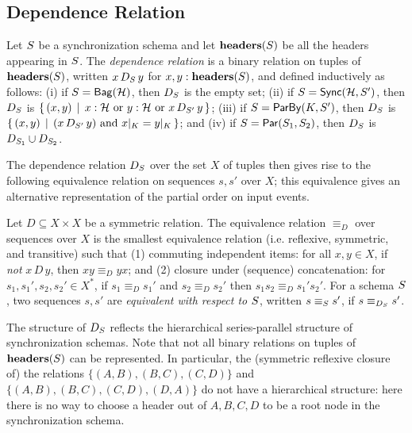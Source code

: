 \subsection{Dependence Relation}

\begin{definition}
\label{45:def:dep-relation}
Let $\ss$ be a synchronization schema and let $\headers(\ss)$ be all the headers appearing in $\ss$.
The \emph{dependence relation} is a binary relation on tuples of $\headers(\ss)$, written $x\, D_{\ss}\, y$ for $x, y: \headers(\ss)$, and defined inductively as follows:
(i) if $\ss = \relleaf{\mathcal{H}}$, then $D_{\ss}$ is the empty set;
(ii) if $\ss = \hier{\mathcal{H}}{\ss'}$, then
$D_{\ss}$ is $\{\, (x, y)\,\mid\,
    x : \mathcal{H}
    \text{ or } y : \mathcal{H}
    \text{ or } x\, D_{\ss'}\, y\,\}$;
(iii) if $\ss = \keyby{K}{\ss'}$, then
$D_{\ss}$ is $\{\, (x, y) \,\mid\,
    (x\, D_{\ss'}\, y) \text{ and } \tuprestrict{x}{K} = \tuprestrict{y}{K}\,\}$; and
(iv) if $\ss = \parcomp{\ss_1}{\ss_2}$, then
$D_{\ss}$ is $D_{\ss_1} \cup D_{\ss_2}$.
\end{definition}

The dependence relation $D_{\ss}$ over the set $X$ of tuples then gives rise to the following equivalence relation on sequences
$s, s'$ over $X$;
this equivalence gives an alternative representation of the partial order on input events.
\begin{definition}
    Let $D \subseteq X \times X$ be a symmetric relation.
    The equivalence relation $\equiv_D$ over sequences over $X$ is
    the smallest equivalence relation (i.e. reflexive, symmetric, and transitive) such that (1)
    commuting independent items: for all $x, y \in X$, if \emph{not} $x\, D\, y$, then $x y \equiv_D y x$;
    and (2) closure under (sequence) concatenation: for $s_1, s_1', s_2, s_2' \in X^{*}$, if $s_1 \equiv_D s_1'$ and $s_2 \equiv_D s_2'$ then $s_1 s_2 \equiv_D s_1' s_2'$.
    For a schema $\ss$, two sequences $s, s'$ are \emph{equivalent with respect to $\ss$}, written $s \equiv_\ss s'$, if $s \equiv_{D_\ss} s'$.
    \end{definition}
The structure of $D_\ss$ reflects the hierarchical series-parallel structure of synchronization schemas. Note that
not all binary relations on tuples of $\headers(\ss)$ can be represented.
In particular, the (symmetric reflexive closure of)
the relations $\{(A, B), (B, C), (C, D)\}$
and $\{(A, B), (B, C), (C, D), (D, A)\}$
do not have a hierarchical structure:
here there is no way to choose a header out of $A, B, C, D$
to be a root node in the synchronization schema.

